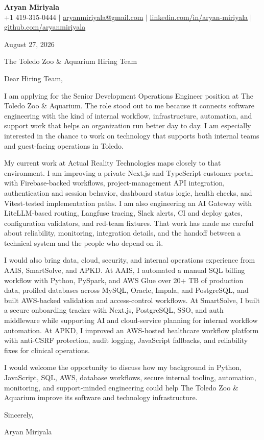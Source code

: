 \documentclass[letterpaper,11pt]{article}
\begin{document}
{\large \textbf{Aryan Miriyala}}\\[-1pt]
\small
+1 419-315-0444 $|$ \href{mailto:aryanmiriyala@gmail.com}{aryanmiriyala@gmail.com} $|$
\href{https://www.linkedin.com/in/aryan-miriyala-7788a21b6/}{linkedin.com/in/aryan-miriyala} $|$
\href{https://github.com/aryanmiriyala}{github.com/aryanmiriyala}

\normalsize

August 27, 2026

The Toledo Zoo \& Aquarium Hiring Team

Dear Hiring Team,

I am applying for the Senior Development Operations Engineer position at The Toledo Zoo \& Aquarium. The role stood out to me because it connects software engineering with the kind of internal workflow, infrastructure, automation, and support work that helps an organization run better day to day. I am especially interested in the chance to work on technology that supports both internal teams and guest-facing operations in Toledo.

My current work at Actual Reality Technologies maps closely to that environment. I am improving a private Next.js and TypeScript customer portal with Firebase-backed workflows, project-management API integration, authentication and session behavior, dashboard status logic, health checks, and Vitest-tested implementation paths. I am also engineering an AI Gateway with LiteLLM-based routing, Langfuse tracing, Slack alerts, CI and deploy gates, configuration validators, and red-team fixtures. That work has made me careful about reliability, monitoring, integration details, and the handoff between a technical system and the people who depend on it.

I would also bring data, cloud, security, and internal operations experience from AAIS, SmartSolve, and APKD. At AAIS, I automated a manual SQL billing workflow with Python, PySpark, and AWS Glue over 20+ TB of production data, profiled databases across MySQL, Oracle, Impala, and PostgreSQL, and built AWS-backed validation and access-control workflows. At SmartSolve, I built a secure onboarding tracker with Next.js, PostgreSQL, SSO, and auth middleware while supporting AI and cloud-service planning for internal workflow automation. At APKD, I improved an AWS-hosted healthcare workflow platform with anti-CSRF protection, audit logging, JavaScript fallbacks, and reliability fixes for clinical operations.

I would welcome the opportunity to discuss how my background in Python, JavaScript, SQL, AWS, database workflows, secure internal tooling, automation, monitoring, and support-minded engineering could help The Toledo Zoo \& Aquarium improve its software and technology infrastructure.

Sincerely,

Aryan Miriyala
\end{document}
